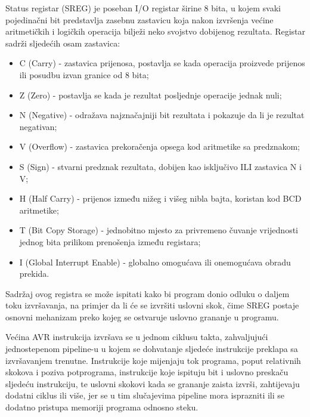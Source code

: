 Status registar (SREG) je poseban I/O registar širine 8 bita, u kojem
svaki pojedinačni bit predstavlja zasebnu zastavicu koja nakon izvršenja
većine aritmetičkih i logičkih operacija bilježi neko svojstvo dobijenog
rezultata. Registar sadrži sljedećih osam zastavica:

\begin{itemize}
    \item C (\foreignlanguage{english}{Carry}) - zastavica prijenosa,
        postavlja se kada operacija proizvede prijenos ili posudbu izvan
        granice od 8 bita;
    \item Z (\foreignlanguage{english}{Zero}) - postavlja se kada je
        rezultat posljednje operacije jednak nuli;
    \item N (\foreignlanguage{english}{Negative}) - odražava najznačajniji
        bit rezultata i pokazuje da li je rezultat negativan;
    \item V (\foreignlanguage{english}{Overflow}) - zastavica
        prekoračenja opsega kod aritmetike sa predznakom;
    \item S (\foreignlanguage{english}{Sign}) - stvarni predznak
        rezultata, dobijen kao isključivo ILI zastavica N i V;
    \item H (\foreignlanguage{english}{Half Carry}) - prijenos između
        nižeg i višeg nibla bajta, koristan kod BCD aritmetike;
    \item T (\foreignlanguage{english}{Bit Copy Storage}) - jednobitno
        mjesto za privremeno čuvanje vrijednosti jednog bita prilikom
        prenošenja između registara;
    \item I (\foreignlanguage{english}{Global Interrupt Enable}) -
        globalno omogućava ili onemogućava obradu prekida.
\end{itemize}

Sadržaj ovog registra se može ispitati kako bi program donio odluku o
daljem toku izvršavanja, na primjer da li će se izvršiti uslovni skok,
čime SREG postaje osnovni mehanizam preko kojeg se ostvaruje uslovno
grananje u programu.

Većina AVR instrukcija izvršava se u jednom ciklusu takta, zahvaljujući
jednostepenom pipeline-u u kojem se dohvatanje sljedeće instrukcije
preklapa sa izvršavanjem trenutne. Instrukcije koje mijenjaju tok
programa, poput relativnih skokova i poziva potprograma, instrukcije
koje ispituju bit i uslovno preskaču sljedeću instrukciju, te uslovni
skokovi kada se grananje zaista izvrši, zahtijevaju dodatni ciklus ili
više, jer se u tim slučajevima pipeline mora isprazniti ili se dodatno
pristupa memoriji programa odnosno steku.
%
